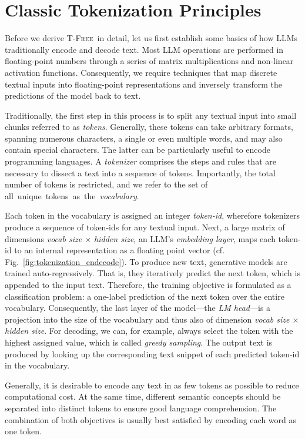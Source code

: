 \documentclass[11pt]{article}
\newcommand{\method}{\textsc{T-Free}}
\begin{document}
\section{Classic Tokenization Principles}
\label{sec:background}
Before we derive \method~in detail, let us first establish some basics of how LLMs traditionally encode and decode text. Most LLM operations
are performed in floating-point numbers through a series of matrix multiplications and non-linear activation functions.
Consequently, we require techniques that map discrete textual inputs into floating-point representations and inversely transform the predictions of the model back to text. 

Traditionally, the first step in this process is to split any textual input into small chunks referred to as \textit{tokens}. Generally, these tokens can take arbitrary formats, spanning numerous characters, a single or even multiple words, and may also contain special characters. The latter can be particularly useful to encode programming languages. 
A \textit{tokenizer} comprises the steps and rules that are necessary to dissect a text into a sequence of tokens. Importantly, the total number of tokens is restricted, and we refer to the set of \mbox{all unique tokens as the \textit{vocabulary}.} 

Each token in the vocabulary is assigned an integer \textit{token-id}, wherefore tokenizers produce a sequence of token-ids for any textual input. 
Next, a large matrix of dimensions \emph{vocab size $\times$ hidden size}, an LLM's \textit{embedding layer}, maps each token-id to an internal representation as a floating point vector (cf. Fig.~\ref{fig:tokenization_endecode}). 
To produce new text, generative models are trained auto-regressively. That is, they iteratively predict the next token, which is appended to the input text. 
Therefore, the training objective is formulated as a classification problem: a one-label prediction of the next token over the entire vocabulary. 
Consequently, the last layer of the model---the \textit{LM head}---is a projection into the size of the vocabulary and thus also of dimension \emph{vocab size $\times$ hidden size}. For decoding, we can, for example, always select the token with the highest assigned value, which is called \textit{greedy sampling}.
The output text is produced by looking up the corresponding text snippet of each predicted token-id in the vocabulary.

Generally, it is desirable to encode any text in as few tokens as possible to reduce computational cost. 
At the same time, different semantic concepts should be separated into distinct tokens to ensure good language comprehension. The combination of both objectives is usually best satisfied by encoding each word as one token. 
\end{document}
